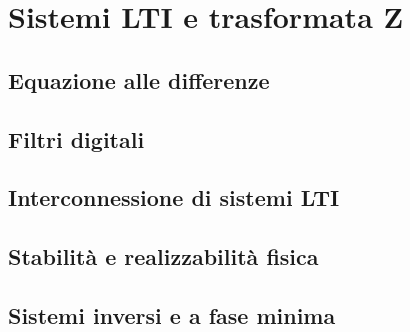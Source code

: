 \documentclass[../main.tex]{subfiles}
\begin{document}
\clearpage
\thispagestyle{empty}
\vspace*{7cm}
\section{Sistemi LTI e trasformata Z}
\vspace*{1.5cm}


\subsection{Equazione alle differenze}
\subsection{Filtri digitali}
\subsection{Interconnessione di sistemi LTI}
\subsection{Stabilità e realizzabilità fisica}
\subsection{Sistemi inversi e a fase minima}
\end{document}
